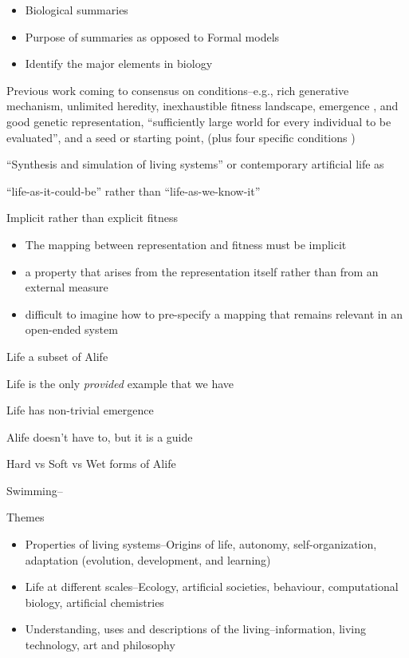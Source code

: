 \autocite{Godfrey-Smith2007}
\begin{itemize}
	\item Biological summaries
	\item Purpose of summaries as opposed to Formal models
	\item Identify the major elements in biology
\end{itemize}

Previous work coming to consensus on conditions--e.g., rich generative mechanism, unlimited heredity, inexhaustible fitness landscape, emergence \autocite{Vasas2015}, and good genetic representation, ``sufficiently large world for every individual to be evaluated'', and a seed or starting point, (plus four specific conditions \autocite{Soros2014})


``Synthesis and simulation of living systems'' or contemporary artificial life as 

``life-as-it-could-be'' rather than ``life-as-we-know-it'' \autocite{Langton1989}

Implicit rather than explicit fitness

\begin{itemize}
	\item
	      The mapping between representation and fitness must be implicit
	\item
	      a property that arises from the representation itself rather than from
	      an external measure
	\item
	      difficult to imagine how to pre-specify a mapping that remains
	      relevant in an open-ended system
\end{itemize}

Life a subset of Alife

Life is the only \emph{provided} example that we have

Life has non-trivial emergence

Alife doesn't have to, but it is a guide

Hard vs Soft vs Wet forms of Alife

Swimming--\autocite{Terzopoulos1994}


Themes \autocite{Aguilar2014}

\begin{itemize}
	\item
	      Properties of living systems--Origins of life, autonomy, self-organization, adaptation (evolution, development, and learning)
	\item
	      Life at different scales--Ecology, artificial societies, behaviour, computational biology, artificial chemistries
	\item
	      Understanding, uses and descriptions of the living--information, living technology, art and philosophy
\end{itemize}

